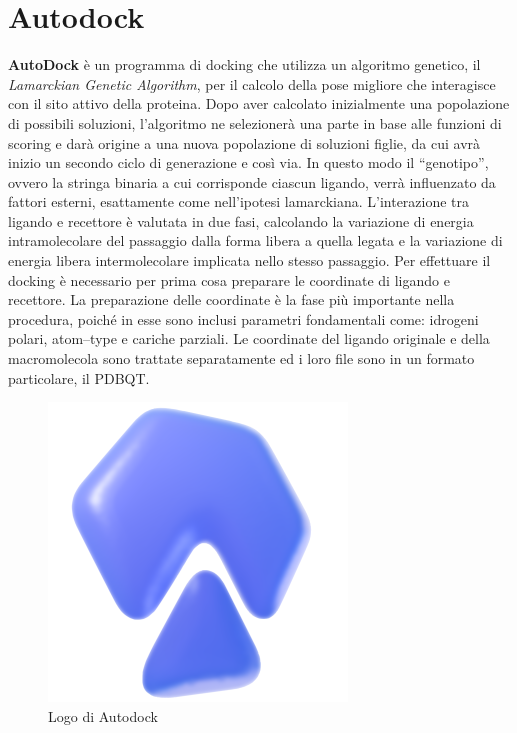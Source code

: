 \section{Autodock}
\textbf{AutoDock} è un programma di docking che utilizza un algoritmo genetico, il \textit{Lamarckian Genetic Algorithm}, per il calcolo della pose migliore che interagisce con il sito attivo della proteina. Dopo aver calcolato inizialmente una popolazione di possibili soluzioni, l’algoritmo ne selezionerà una parte in base alle funzioni di scoring e darà origine a una nuova popolazione di soluzioni figlie, da cui avrà inizio un secondo ciclo di generazione e così via. In questo modo il “genotipo”, ovvero la stringa binaria a cui corrisponde ciascun ligando, verrà influenzato da fattori esterni, esattamente come nell’ipotesi lamarckiana.\newline
L’interazione tra ligando e recettore è valutata in due fasi, calcolando la variazione di energia intramolecolare del passaggio dalla forma libera a quella legata e la variazione di energia libera intermolecolare implicata nello stesso passaggio.\newline
Per effettuare il docking è necessario per prima cosa preparare le coordinate di ligando e recettore. La preparazione delle coordinate è la fase più importante nella procedura, poiché in esse sono inclusi parametri fondamentali come: idrogeni polari, atom–type e cariche parziali. Le coordinate del ligando originale e della macromolecola sono trattate separatamente ed i loro file sono in un formato particolare, il PDBQT.

\begin{figure}[H]
    \centering
    \includegraphics[scale=0.5]{immagini/capitolo2/autodockLogo.png}
    \caption{Logo di Autodock}
    \label{fig:autodock logo}
\end{figure}

